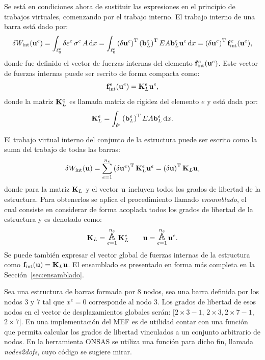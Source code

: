 Se está en condiciones ahora de sustituir las expresiones en el principio de trabajos virtuales, comenzando por el trabajo interno. El trabajo interno de una barra está dado por:
%
\begin{equation}
\delta W_{\text{int}}(\bfu^e) %
= \int_{\ell_0^e}  \delta \varepsilon^e \, \sigma^e \, A \, \dif x %
%
= \int_{\ell_0^e} \left( \delta \bfu^e\right)^{\text{T}} \left( \bfb_L^e\right)^{\text{T}} E A \bfb_L^e \bfu^e \, \dif x  %
%
= \left( \delta \bfu^e \right)^{\text{T}} \bff^e_{\text{int}}(\bfu^e),
\end{equation}
%
donde fue definido el vector de fuerzas internas del elemento ${\bf f}^e_{\text{int}}({\bf u}^e)$. %
%
Este vector de fuerzas internas puede ser escrito de forma compacta como:
%
\begin{equation}
{\bf f}^e_{\text{int}} ({\bf u}^e) = {\bf K}_L^e {\bf u}^e,
\end{equation}
%
donde la matriz ${\bf K}^e_L$ es llamada matriz de rigidez del elemento $e$ y está dada por:
%
\begin{equation}
{\bf K}_L^e = \int_{\ell^e} \left( {\bf b}_L^e\right)^{\text{T}} E A {\bf b}_L^e \, {\text{d}} x.
\end{equation}
%

El trabajo virtual interno del conjunto de la estructura puede ser escrito como la suma del trabajo de todas las barras:
%
\begin{equation}
\delta W_{\text{int}}({\bf u}) = \sum_{e=1}^{n_e} \left(\delta {\bf u}^e\right)^{\text{T}} {\bf K}_L^e {\bf u}^e = \left(\delta {\bf u} \right)^{\text{T}} {\bf K}_L {\bf u},
\end{equation}
%
donde para la matriz ${\bf K}_L$ y el vector ${\bf u}$ incluyen todos los grados de libertad de la estructura. %
%
Para obtenerlos se aplica el procedimiento llamado \textit{ensamblado}, el cual consiste en considerar de forma acoplada todos los grados de libertad de la estructura y es denotado como:
%
\begin{equation}
\bfK_L = \assem_{e=1}^{n_e} \bfK_L^e \qquad   \bfu = \assem_{e=1}^{n_e} \bfu^e.
\end{equation}
%
Se puede también expresar el vector global de fuerzas internas de la estructura como ${\bf f}_{\text{int}} ({\bf u}) = {\bf K}_L {\bf u}$. %
%
El ensamblado es presentado en forma más completa en la Sección~\ref{sec:ensamblado}. 

Sea una estructura de barras formada por 8 nodos, sea una barra definida por los nodos 3 y 7 tal que $x^e=0$ corresponde al nodo 3. %
%
Los grados de libertad de esos nodos en el vector de desplazamientos globales serán: $[ 2\times 3 -1$, $2\times 3, 2\times 7 -1$, $2\times 7]$. %
%
En una implementación del MEF es de utilidad contar con una función que permita calcular los grados de libertad vinculados a un conjunto arbitrario de nodos. %
%
En la herramienta ONSAS se utiliza una función para dicho fin, llamada \textit{nodes2dofs}, cuyo código se sugiere mirar.


